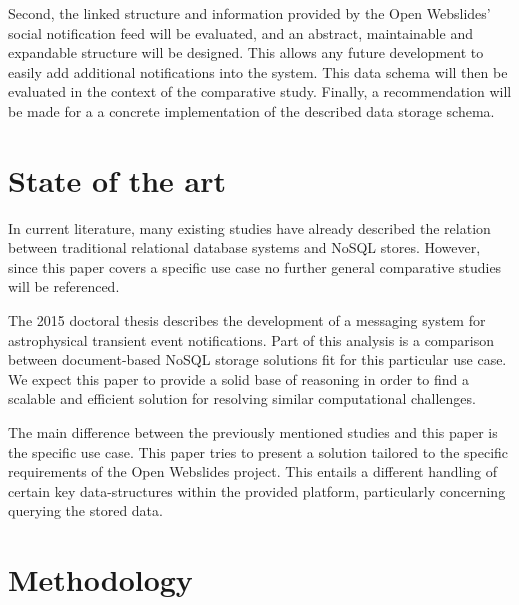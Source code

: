 \documentclass[fleqn,10pt]{voorstel}
\begin{document}
Second, the linked structure and information provided by the Open Webslides' social notification feed will be evaluated, and an abstract, maintainable and expandable structure will be designed. This allows any future development to easily add additional notifications into the system.
This data schema will then be evaluated in the context of the comparative study. Finally, a recommendation will be made for a a concrete implementation of the described data storage schema.


\section{State of the art}
\label{sec:state-of-the-art}

In current literature, many existing studies have already described the relation between traditional relational database systems and NoSQL stores. However, since this paper covers a specific use case no further general comparative studies will be referenced.

The 2015 doctoral thesis \autocite{Zhao2015} describes the development of a messaging system for astrophysical transient event notifications. Part of this analysis is a comparison between document-based NoSQL storage solutions fit for this particular use case. We expect this paper to provide a solid base of reasoning in order to find a scalable and efficient solution for resolving similar computational challenges.

The main difference between the previously mentioned studies and this paper is the specific use case. This paper tries to present a solution tailored to the specific requirements of the Open Webslides project. This entails a different handling of certain key data-structures within the provided platform, particularly concerning querying the stored data.


\section{Methodology}
\label{sec:methodology}
\end{document}
